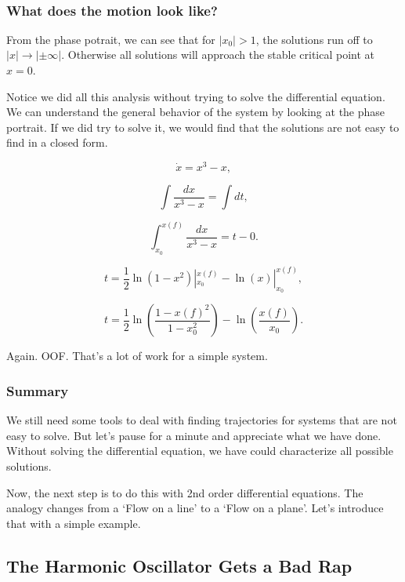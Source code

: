 \documentclass[11pt]{article}
\begin{document}
    \begin{center}
    \end{center}
    { \hspace*{\fill} \\}
    
    \subsubsection{What does the motion look
like?}\label{what-does-the-motion-look-like}

From the phase potrait, we can see that for \(|x_0| > 1\), the solutions
run off to \(|x| \rightarrow |\pm \infty|\). Otherwise all solutions
will approach the stable critical point at \(x = 0\).

Notice we did all this analysis without trying to solve the differential
equation. We can understand the general behavior of the system by
looking at the phase portrait. If we did try to solve it, we would find
that the solutions are not easy to find in a closed form.

\[\dot{x} = x^3 - x,\]

\[\int \frac{dx}{x^3 - x} = \int dt,\]

\[\int_{x_0}^{x(f)} \frac{dx}{x^3 - x} = t - 0.\]

\[t = \dfrac{1}{2}\ln(1-x^2)|_{x_0}^{x(f)} -\ln(x)|_{x_0}^{x(f)},\]

\[t= \dfrac{1}{2}\ln\left(\dfrac{1-x(f)^2}{1-x_0^2}\right) - \ln\left(\dfrac{x(f)}{x_0}\right).\]

Again. OOF. That's a lot of work for a simple system.

\subsubsection{Summary}\label{summary}

We still need some tools to deal with finding trajectories for systems
that are not easy to solve. But let's pause for a minute and appreciate
what we have done. Without solving the differential equation, we have
could characterize all possible solutions.

Now, the next step is to do this with 2nd order differential equations.
The analogy changes from a `Flow on a line' to a `Flow on a plane'.
Let's introduce that with a simple example.

    \subsection{The Harmonic Oscillator Gets a Bad
Rap}\label{the-harmonic-oscillator-gets-a-bad-rap}
\end{document}
